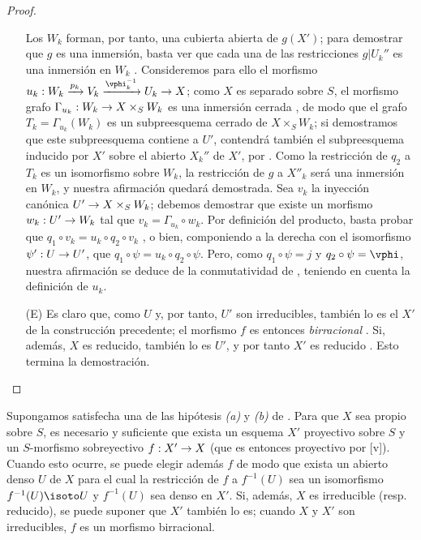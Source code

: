 \documentclass[oneside,10pt]{amsart}
\makeatletter
\newcommand{\ega@arrow}[2]{\mathchoice{#1}{#2}{#2}{#2}}
\renewcommand{\to}{\ega@arrow{\longrightarrow}{\rightarrow}}
\newcommand{\oldpage}[2][]{\marginnote{\normalfont\footnotesize\textbf{#1}~|~#2}\ignorespaces}
\let\EGAOriginalLabel\label
\renewcommand{\label}[1]{\phantomsection\EGAOriginalLabel{#1}}
\makeatother
\begin{document}
\begin{proof}
\begin{enumerate}
    Los $W_k$ forman, por tanto, una cubierta abierta de $g(X')$; para demostrar que $g$ es una inmersión, basta ver que cada una de las restricciones $g|U_k''$ es una inmersión en $W_k$ .
    Consideremos para ello el morfismo $u_k:W_k\xrightarrow{p_k}V_k\xrightarrow{\vphi_k^{-1}}U_k\to X$; como $X$ es separado sobre $S$, el morfismo grafo $\Gamma_{u_k}:W_k\to X\times_S W_k$ es una inmersión cerrada , de modo que el grafo $T_k=\Gamma_{u_k}(W_k)$ es un subpreesquema cerrado de $X\times_S W_k$;
    si demostramos que este subpreesquema contiene a $U'$, contendrá también el subpreesquema inducido por $X'$ sobre el abierto $X_k''$ de $X'$, por .
    Como la restricción de $q_2$ a $T_k$ es un isomorfismo sobre $W_k$, la restricción de $g$ a $X''_k$ será una inmersión en $W_k$, y nuestra afirmación quedará demostrada.
    Sea $v_k$ la inyección canónica $U'\to X\times_S W_k$; debemos demostrar que existe un morfismo $w_k:U'\to W_k$ tal que $v_k=\Gamma_{u_k}\circ w_k$.
    Por definición del producto, basta probar que $q_1\circ v_k=u_k\circ q_2\circ v_k$ , o bien, componiendo a la derecha
\oldpage[II]{109}
    con el isomorfismo $\psi':U\to U'$, que $q_1\circ\psi=u_k\circ q_2\circ\psi$.
    Pero, como $q_1\circ\psi=j$ y $q_2\circ\psi=\vphi$, nuestra afirmación se deduce de la conmutatividad de , teniendo en cuenta la definición de $u_k$.

  \item[(E)] Es claro que, como $U$ y, por tanto, $U'$ son irreducibles, también lo es el $X'$ de la construcción precedente; el morfismo $f$ es entonces \emph{birracional} .
    Si, además, $X$ es reducido, también lo es $U'$, y por tanto $X'$ es reducido .
    Esto termina la demostración.
\end{enumerate}
\end{proof}

\begin{corollary}[5.6.2]
\label{II.5.6.2}
Supongamos satisfecha una de las hipótesis \emph{(a)} y \emph{(b)} de .
Para que $X$ sea propio sobre $S$, es necesario y suficiente que exista un esquema $X'$ proyectivo sobre $S$ y un $S$-morfismo sobreyectivo $f:X'\to X$ (que es entonces proyectivo por [v]).
Cuando esto ocurre, se puede elegir además $f$ de modo que exista un abierto denso $U$ de $X$ para el cual la restricción de $f$ a $f^{-1}(U)$ sea un isomorfismo $f^{-1}(U)\isoto U$ y $f^{-1}(U)$ sea denso en $X'$.
Si, además, $X$ es irreducible \textup{(resp.} reducido), se puede suponer que $X'$ también lo es; cuando $X$ y $X'$ son irreducibles, $f$ es un morfismo birracional.
\end{corollary}
\end{document}
